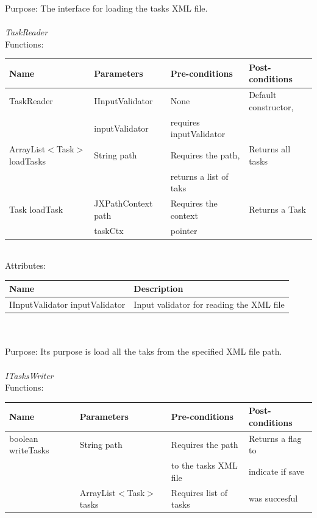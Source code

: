 Purpose: The interface for loading the tasks XML file.
\\
\\
\emph{TaskReader}\\
Functions:\\
\begin{tabular}{| l | l | l | l |}
\hline
Name & Parameters & Pre-conditions & Post-conditions\\
\hline
		TaskReader				& IInputValidator 	& None				& Default constructor, \\
							& inputValidator	&  requires inputValidator	& \\
\hline
		ArrayList$<$Task$>$loadTasks 	& String path       	& Requires the path,		& Returns all tasks\\
                                                                                    &                         	& returns a list of taks 	 &\\
\hline
		Task loadTask	 			& JXPathContext path & Requires the context	& Returns a Task \\
                                                                                    & taskCtx                	& pointer			& 
\\
\hline
\end{tabular}
\\

Attributes:\\
\begin{tabular}{| l | l |}
\hline
 Name                                     	 	& Description\\
\hline
IInputValidator inputValidator		& Input validator for reading the XML file\\
\hline
\end{tabular}\\
\\

Purpose: Its purpose is load all the taks from the specified XML file path.
\\
\\

\emph{ITasksWriter}\\
Functions:\\
\begin{tabular}{| l | l | l | l |}
\hline
Name & Parameters & Pre-conditions & Post-conditions\\
\hline
		boolean writeTasks 	& String path       			& Requires the path 		& Returns a flag to\\
                                                           & 					& to the tasks XML file		& indicate if save \\
\hline
                                                           & ArrayList$<$Task$>$ tasks		& Requires list	of tasks	& was succesful
\\
\hline
\end{tabular}
\\

